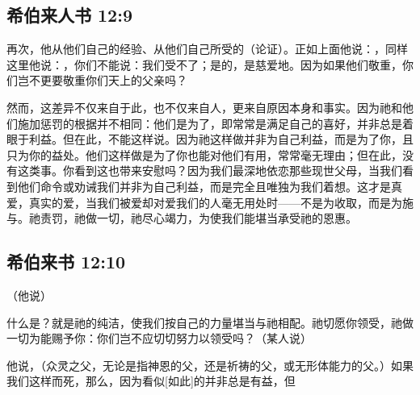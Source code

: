 
\subsection{希伯来人书 12:9}

再次，他从他们自己的经验、从他们自己所受的（论证）。正如上面他说：，同样这里他说：，你们不能说：我们受不了；是的，是慈爱地。因为如果他们敬重，你们岂不更要敬重你们天上的父亲吗？\par

然而，这差异不仅来自于此，也不仅来自人，更来自原因本身和事实。因为祂和他们施加惩罚的根据并不相同：他们是为了，即常常是满足自己的喜好，并非总是着眼于利益。但在此，不能这样说。因为祂这样做并非为自己利益，而是为了你，且只为你的益处。他们这样做是为了你也能对他们有用，常常毫无理由；但在此，没有这类事。你看到这也带来安慰吗？因为我们最深地依恋那些现世父母，当我们看到他们命令或劝诫我们并非为自己利益，而是完全且唯独为我们着想。这才是真爱，真实的爱，当我们被爱却对爱我们的人毫无用处时——不是为收取，而是为施与。祂责罚，祂做一切，祂尽心竭力，为使我们能堪当承受祂的恩惠。\par


\subsection{希伯来书 12:10}

（他说）\par

什么是？就是祂的纯洁，使我们按自己的力量堪当与祂相配。祂切愿你领受，祂做一切为能赐予你：你们岂不应切切努力以领受吗？（某人说）\par

他说，（众灵之父，无论是指神恩的父，还是祈祷的父，或无形体能力的父。）如果我们这样而死，那么，因为看似[如此]的并非总是有益，但\par

